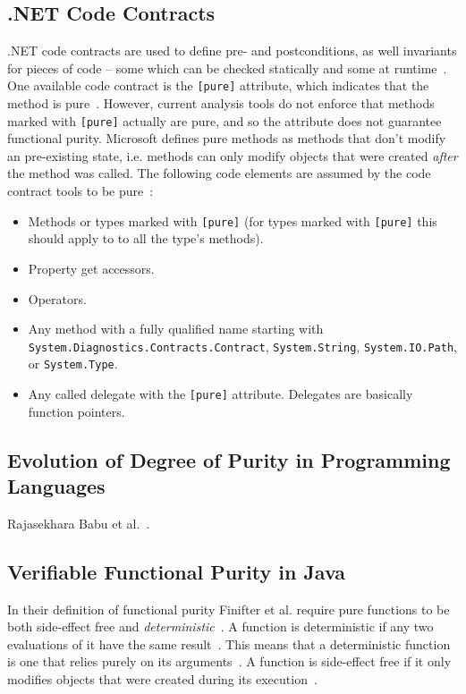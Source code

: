 \documentclass[a4paper,12pt]{article}
\begin{document}
\subsection{.NET Code Contracts} \label{sub:Code contracts} %
.NET code contracts are used to define pre- and postconditions, as well invariants for pieces of code -- some which can be checked statically and some at runtime~\cite{microsoft-code-contracts}. One available code contract is the \texttt{[pure]} attribute, which indicates that the method is pure~\cite{microsoft-code-contracts}. However, current analysis tools do not enforce that methods marked with \texttt{[pure]} actually are pure, and so the attribute does not guarantee functional purity. Microsoft defines pure methods as methods that don't modify an pre-existing state, i.e. methods can only modify objects that were created \textit{after} the method was called. The following code elements are assumed by the code contract tools to be pure~\cite{microsoft-code-contracts}:

\begin{itemize}
  \item Methods or types marked with \texttt{[pure]} (for types marked with \texttt{[pure]} this should apply to to all the type's methods).
  \item Property get accessors.
  \item Operators.
  \item Any method with a fully qualified name starting with \texttt{System.Diagnost\-ics.Contracts.Contract}, \texttt{System.String}, \texttt{System\-.IO.Path}, or \texttt{System.Type}.
  \item Any called delegate with the \texttt{[pure]} attribute. Delegates are basically function pointers.
\end{itemize}

\subsection{Evolution of Degree of Purity in Programming Languages} \label{sub:Evolution of Degree of Purity in Programming Languages}
Rajasekhara Babu et al.~\cite{rajasekharababu2012evolution}.

\subsection{Verifiable Functional Purity in Java} \label{sub:Verifiable-Functional-Purity-in-Java}
In their definition of functional purity Finifter et al. require pure functions to be both side-effect free and \textit{deterministic}~\cite{purity-in-java}. A function is deterministic if any two evaluations of it have the same result~\cite{purity-in-java}. This means that a deterministic function is one that relies purely on its arguments~\cite{purity-in-java}. A function is side-effect free if it only modifies objects that were created during its execution~\cite{purity-in-java}.
\end{document}
